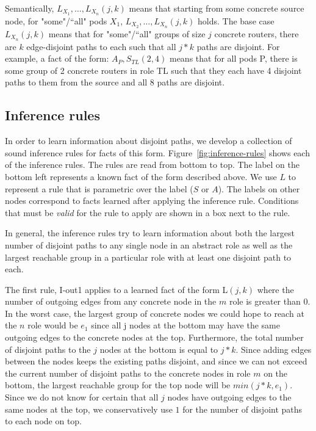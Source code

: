 \documentclass[numbers, 10pt, preprint]{sigplanconf}
\begin{document}
Semantically, $L_{X_1}, \ldots, L_{X_n}(j,k)$ means that starting from some concrete source node, for "some"/``all" pods $X_1$, $L_{X_2}, \ldots, L_{X_n}(j,k)$ holds. The base case $L_{X_n}(j,k)$ means that for "some"/``all" groups of size $j$ concrete routers, there are $k$ edge-disjoint paths to each such that all $j*k$ paths are disjoint.
%
For example, a fact of the form: $A_P, S_{TL}(2,4)$ means that for all pods P, there is some group of 2 concrete routers in role TL such that they each have 4 disjoint paths to them from the source and all 8 paths are disjoint.

\subsection{Inference rules}

\newcommand{\infrule}[1]{{\small \sf #1}\xspace}

In order to learn information about disjoint paths, we develop a collection of sound inference rules for facts of this form. Figure~\ref{fig:inference-rules} shows each of the inference rules. The rules are read from bottom to top. The label on the bottom left represents a known fact of the form described above. We use $L$ to represent a rule that is parametric over the label ($S$ or $A$). The labels on other nodes correspond to facts learned after applying the inference rule. Conditions that must be \emph{valid} for the rule to apply are shown in a box next to the rule.

In general, the inference rules try to learn information about both the largest number of disjoint paths to any single node in an abstract role as well as the largest reachable group in a particular role with at least one disjoint path to each.

The first rule, \infrule{I-out1} applies to a learned fact of the form L$(j,k)$ where the number of outgoing edges from any concrete node in the $m$ role is greater than 0. In the worst case, the largest group of concrete nodes we could hope to reach at the $n$ role would be $e_1$ since all j nodes at the bottom may have the same outgoing edges to the concrete nodes at the top. Furthermore, the total number of disjoint paths to the $j$ nodes at the bottom is equal to $j*k$. Since adding edges between the nodes keeps the existing paths disjoint, and since we can not exceed the current number of disjoint paths to the concrete nodes in role $m$ on the bottom, the largest reachable group for the top node will be $min(j*k,e_1)$. Since we do not know for certain that all $j$ nodes have outgoing edges to the same nodes at the top, we conservatively use $1$ for the number of disjoint paths to each node on top.
\end{document}
